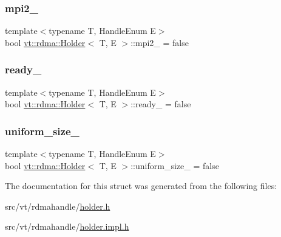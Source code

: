 \mbox{\label{structvt_1_1rdma_1_1_holder_aecfc6828df1f361fa24e2780b07b6d56}} 
\subsubsection{\texorpdfstring{mpi2\+\_\+}{mpi2\_}}
{\footnotesize\ttfamily template$<$typename T, Handle\+Enum E$>$ \\
bool \hyperlink{structvt_1_1rdma_1_1_holder}{vt\+::rdma\+::\+Holder}$<$ T, E $>$\+::mpi2\+\_\+ = false\hspace{0.3cm}{\ttfamily [private]}}

\mbox{\label{structvt_1_1rdma_1_1_holder_ad61ee11705da8cf0ba8664b3173e7370}} 
\subsubsection{\texorpdfstring{ready\+\_\+}{ready\_}}
{\footnotesize\ttfamily template$<$typename T, Handle\+Enum E$>$ \\
bool \hyperlink{structvt_1_1rdma_1_1_holder}{vt\+::rdma\+::\+Holder}$<$ T, E $>$\+::ready\+\_\+ = false\hspace{0.3cm}{\ttfamily [private]}}

\mbox{\label{structvt_1_1rdma_1_1_holder_a6c137c841a55e053778597860c6761e8}} 
\subsubsection{\texorpdfstring{uniform\+\_\+size\+\_\+}{uniform\_size\_}}
{\footnotesize\ttfamily template$<$typename T, Handle\+Enum E$>$ \\
bool \hyperlink{structvt_1_1rdma_1_1_holder}{vt\+::rdma\+::\+Holder}$<$ T, E $>$\+::uniform\+\_\+size\+\_\+ = false\hspace{0.3cm}{\ttfamily [private]}}



The documentation for this struct was generated from the following files\+:\begin{DoxyCompactItemize}
\item 
src/vt/rdmahandle/\hyperlink{rdmahandle_2holder_8h}{holder.\+h}\item 
src/vt/rdmahandle/\hyperlink{rdmahandle_2holder_8impl_8h}{holder.\+impl.\+h}\end{DoxyCompactItemize}
